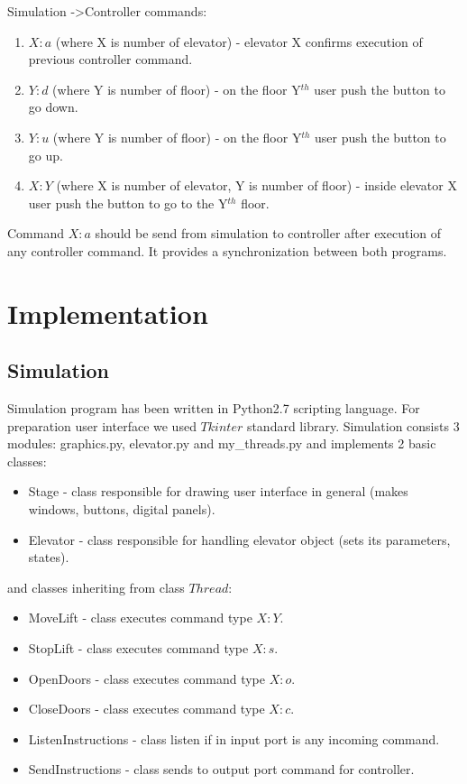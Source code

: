 \documentclass[12pt]{article}
\begin{document}
Simulation -\textgreater Controller commands:
\begin{enumerate}
	\item $X:a$ (where X is number of elevator) - elevator X confirms execution of previous controller command.
	\item $Y:d$ (where Y is number of floor) - on the floor Y$^{th}$ user push the button to go down.
	\item $Y:u$ (where Y is number of floor) - on the floor Y$^{th}$ user push the button to go up.
	\item $X:Y$ (where X is number of elevator, Y is number of floor) - inside elevator X user push the button to go to the Y$^{th}$ floor.
\end{enumerate}	

Command $X:a$ should be send from simulation to controller after execution of any controller command. It provides a synchronization between both programs.
\newline
\newline

\section{Implementation}
\subsection{Simulation}
Simulation program has been written in Python2.7 scripting language. For preparation user interface we used $Tkinter$ standard library. 
Simulation consists 3 modules: graphics.py, elevator.py and my{\_}threads.py and implements 2 basic classes:  
\begin{itemize}
 \item Stage - class responsible for drawing user interface in general (makes windows, buttons, digital panels).
 \item Elevator - class responsible for handling elevator object (sets its parameters, states). 
\end{itemize}
and classes inheriting from class $Thread$:
\begin{itemize}
 \item MoveLift - class executes command type $X:Y$.
 \item StopLift - class executes command type $X:s$.
 \item OpenDoors - class executes command type $X:o$.
 \item CloseDoors - class executes command type $X:c$.
 \item ListenInstructions - class listen if in input port is any incoming command.
 \item SendInstructions - class sends to output port command for controller.
\end{itemize}
\end{document}
